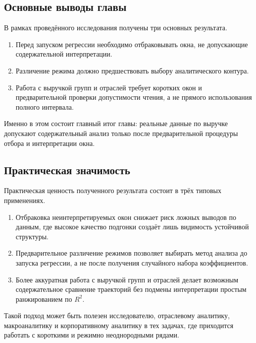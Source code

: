 \subsection{Основные выводы главы}
\label{sec:osnovnye-vyvody-glavy}

В рамках проведённого исследования получены три основных результата.

\begin{enumerate}
\def\labelenumi{\arabic{enumi}.}
\tightlist
\item
  Перед запуском регрессии необходимо отбраковывать окна, не допускающие содержательной интерпретации.
\item
  Различение режима должно предшествовать выбору аналитического контура.
\item
  Работа с выручкой групп и отраслей требует коротких окон и предварительной проверки допустимости чтения, а не прямого использования полного интервала.
\end{enumerate}

Именно в этом состоит главный итог главы: реальные данные по выручке допускают содержательный анализ только после предварительной процедуры отбора и интерпретации окна.

\subsection{Практическая значимость}
\label{sec:prakticheskaya-znachimost}

Практическая ценность полученного результата состоит в трёх типовых применениях.

\begin{enumerate}
\def\labelenumi{\arabic{enumi}.}
\tightlist
\item
  Отбраковка неинтерпретируемых окон снижает риск ложных выводов по данным, где высокое качество подгонки создаёт лишь видимость устойчивой структуры.
\item
  Предварительное различение режимов позволяет выбирать метод анализа до запуска регрессии, а не после получения случайного набора коэффициентов.
\item
  Более аккуратная работа с выручкой групп и отраслей делает возможным содержательное сравнение траекторий без подмены интерпретации простым ранжированием по \(R^2\).
\end{enumerate}

Такой подход может быть полезен исследователю, отраслевому аналитику, макроаналитику и корпоративному аналитику в тех задачах, где приходится работать с короткими и режимно неоднородными рядами.

